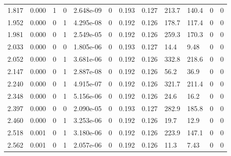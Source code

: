 \documentclass[preview]{standalone}
\begin{document}
{{\begin{tabular}{L{1.2cm}C{1.2cm} C{0.3cm}C{0.5cm} C{1.4cm}C{1.4cm} C{1.4cm}C{1.4cm} C{1.6cm}C{1.6cm} C{1.6cm}C{1.6cm}}
  1.817  &  0.000  & 1     &  0 &  2.648e-09  & 0  &  0.193&   0.127& 213.7 & 140.4   &  0 & 0  \\ 
  1.952  &  0.000  & 0     &  1 &  4.295e-08  & 0  &  0.192&   0.126& 178.7 & 117.4   &  0 & 0  \\ 
  1.981  &  0.000  & 0     &  1 &  2.549e-05  & 0  &  0.192&   0.126& 259.3 & 170.3   &  0 & 0  \\ 
  2.033  &  0.000  & 0     &  0 &  1.805e-06  & 0  &  0.193&   0.127& 14.4 & 9.48   &  0 & 0  \\ 
  2.052  &  0.000  & 0     &  1 &  3.681e-06  & 0  &  0.192&   0.126& 332.8 & 218.6   &  0 & 0  \\ 
  2.147  &  0.000  & 0     &  1 &  2.887e-08  & 0  &  0.192&   0.126& 56.2 & 36.9   &  0 & 0  \\ 
  2.240  &  0.000  & 0     &  1 &  4.915e-07  & 0  &  0.192&   0.126& 321.7 & 211.4   &  0 & 0  \\ 
  2.348  &  0.000  & 0     &  1 &  5.156e-06  & 0  &  0.192&   0.126& 24.6 & 16.2   &  0 & 0  \\ 
  2.397  &  0.000  & 0     &  0 &  2.090e-05  & 0  &  0.193&   0.127& 282.9 & 185.8   &  0 & 0  \\ 
  2.460  &  0.000  & 0     &  1 &  3.253e-06  & 0  &  0.192&   0.126& 19.7 & 12.9   &  0 & 0  \\ 
  2.518  &  0.001  & 0     &  1 &  3.180e-06  & 0  &  0.192&   0.126& 223.9 & 147.1   &  0 & 0  \\ 
  2.562  &  0.001  & 0     &  1 &  2.057e-06  & 0  &  0.192&   0.126& 11.3 & 7.43   &  0 & 0  \\ 
\hline 
\end{tabular} 

}}
\end{document}
